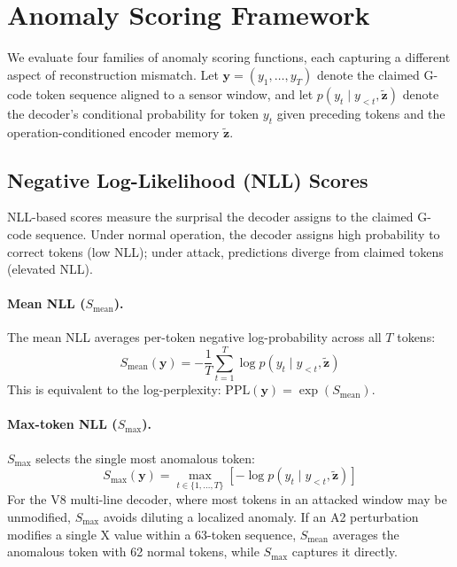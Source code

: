 \section{Anomaly Scoring Framework}
\label{sec:scoring}

We evaluate four families of anomaly scoring functions, each capturing a different aspect of reconstruction mismatch.
Let $\mathbf{y} = (y_1, \ldots, y_T)$ denote the claimed G-code token sequence aligned to a sensor window, and let $p(y_t \mid y_{<t}, \tilde{\mathbf{z}})$ denote the decoder's conditional probability for token $y_t$ given preceding tokens and the operation-conditioned encoder memory $\tilde{\mathbf{z}}$.

\subsection{Negative Log-Likelihood (NLL) Scores}
\label{sec:nll_score}

NLL-based scores measure the surprisal the decoder assigns to the claimed G-code sequence.
Under normal operation, the decoder assigns high probability to correct tokens (low NLL); under attack, predictions diverge from claimed tokens (elevated NLL).

\paragraph{Mean NLL ($S_{\text{mean}}$).}
The mean NLL averages per-token negative log-probability across all $T$ tokens:
\begin{equation}
    S_{\text{mean}}(\mathbf{y}) = -\frac{1}{T} \sum_{t=1}^{T} \log p(y_t \mid y_{<t}, \tilde{\mathbf{z}})
    \label{eq:s_mean}
\end{equation}
This is equivalent to the log-perplexity: $\text{PPL}(\mathbf{y}) = \exp(S_{\text{mean}})$.

\paragraph{Max-token NLL ($S_{\max}$).}
$S_{\max}$ selects the single most anomalous token:
\begin{equation}
    S_{\max}(\mathbf{y}) = \max_{t \in \{1, \ldots, T\}} \left[ -\log p(y_t \mid y_{<t}, \tilde{\mathbf{z}}) \right]
    \label{eq:s_max}
\end{equation}
For the V8 multi-line decoder, where most tokens in an attacked window may be unmodified, $S_{\max}$ avoids diluting a localized anomaly.
If an A2 perturbation modifies a single X value within a 63-token sequence, $S_{\text{mean}}$ averages the anomalous token with 62 normal tokens, while $S_{\max}$ captures it directly.

